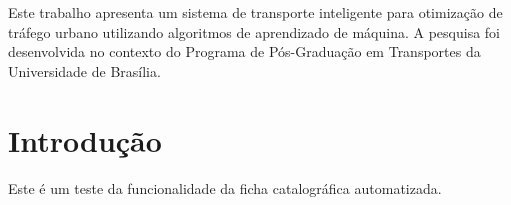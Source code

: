 \documentclass[mestrado]{UnB-PPGT}
\begin{document}
\maketitle

\begin{resumo}
Este trabalho apresenta um sistema de transporte inteligente para otimização de tráfego urbano utilizando algoritmos de aprendizado de máquina. A pesquisa foi desenvolvida no contexto do Programa de Pós-Graduação em Transportes da Universidade de Brasília.
\end{resumo}

\begin{abstract}
This work presents an intelligent transportation system for urban traffic optimization using machine learning algorithms. The research was developed in the context of the Transportation Graduate Program at the University of Brasília.
\end{abstract}

\textual

\chapter{Introdução}

Este é um teste da funcionalidade da ficha catalográfica automatizada.
\end{document}
